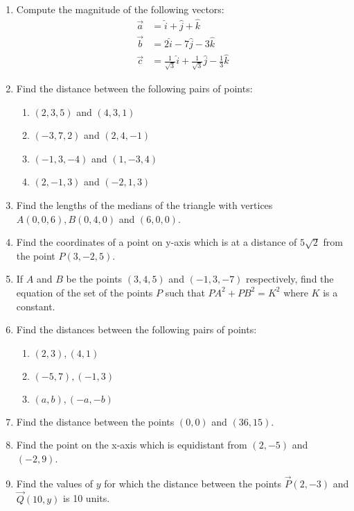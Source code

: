 \begin{enumerate}[label=\thesubsection.\arabic*, ref=\thesubsection.\theenumi]
\item Compute the magnitude of the following vectors:
\begin{align}
	\vec{a}&=\hat{i}+\hat{j}+\hat{k}
	\\
	\vec{b}&=2\hat{i}-7\hat{j}-3\hat{k}
	\\
	\vec{c}&=\frac{1}{\sqrt{3}}\hat{i}+\frac{1}{\sqrt{3}}\hat{j}-\frac{1}{3}\hat{k}
\end{align}
    \solution 
		
\item Find the distance between the following pairs of points:
\begin{enumerate}[label=(\roman*)]
\item $(2, 3, 5)$ and $(4, 3, 1)$
\item $(-3, 7, 2)$ and $(2, 4, -1)$
\item $(-1, 3, -4)$ and $(1, -3, 4)$
\item $(2, -1, 3)$ and $(-2, 1, 3)$
\end{enumerate}
\item Find the lengths of the medians of the triangle with vertices $A(0, 0, 6),  B(0, 4, 0)$ and $(6, 0, 0)$.
\item Find the coordinates of a point on y-axis which is at a distance of $5\sqrt2$ from the point $P(3, -2, 5)$.
\item If $A$ and $B$ be the points $(3, 4, 5)$ and $(-1, 3, -7)$ respectively,  find the equation of the set of the points $P$ such that $PA^2+PB^2=K^2$ where $K$ is a constant.
\item Find the distances between the following pairs of points:
\begin{enumerate}
\item $(2, 3), (4, 1)$
\item $(-5, 7), (-1, 3)$
\item $(a, b), (-a, -b)$
\end{enumerate}
\solution
		
\item Find the distance between the points $(0, 0)$ and $ (36, 15)$.
	\\
		\solution
		
\item Find the point on the x-axis which is equidistant from $(2, -5)$ and $(-2, 9)$.
	\label{it:10/7/1/7}
	\\
\solution
		
\item Find the values of $y$ for which the distance between the points                  $\vec{P}(2, -3)$ and $\vec{Q}(10, y)$ is 10 units.

\end{enumerate}
